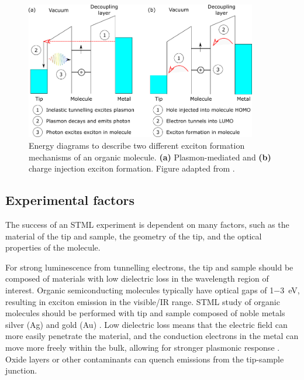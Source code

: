 \begin{figure} [H]
    \centering
    \includegraphics[width=0.9\textwidth]{pictures/exciton_mechanisms.png}
    \caption[Energy diagrams to describe two different exciton formation mechanisms of an organic molecule. \textbf{(a)} Plasmon-mediated and \textbf{(b)} charge injection exciton formation.]{Energy diagrams to describe two different exciton formation mechanisms of an organic molecule. \textbf{(a)} Plasmon-mediated and \textbf{(b)} charge injection exciton formation. Figure adapted from \citep{kuhnke2017atomic}. }
    \label{fig:exptech:2-mechanisms}
\end{figure}



\subsection{Experimental factors}

The success of an \ac{STML} experiment is dependent on many factors, such as the material of the tip and sample, the geometry of the tip, and the optical properties of the molecule.

For strong luminescence from tunnelling electrons, the tip and sample should be composed of materials with low dielectric loss in the wavelength region of interest. Organic semiconducting molecules typically have optical gaps of 1\SI{-3}{eV}, resulting in exciton emission in the visible/IR range. \ac{STML} study of organic molecules should be performed with tip and sample composed of noble metals silver (Ag) \citep{yang2015optical} and gold (Au) \citep{olmon2012optical}. Low dielectric loss means that the electric field can more easily penetrate the material, and the conduction electrons in the metal can move more freely within the bulk, allowing for stronger plasmonic response \citep{novotny2012principles}. Oxide layers or other contaminants can quench emissions from the tip-sample junction.

